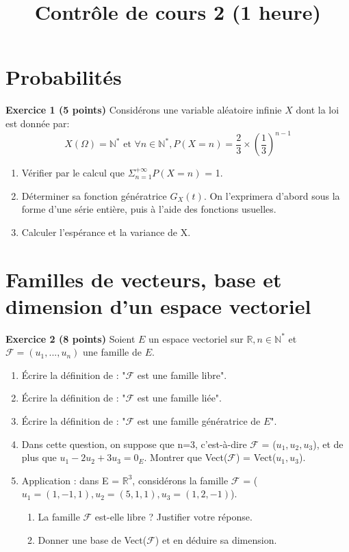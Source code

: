 \documentclass{article}
\author{}
\date{}
\title{Contrôle de cours 2 (1 heure)}
\begin{document}
\maketitle
\section{Probabilités}
\textbf{Exercice 1 (5 points)}\newline
Considérons une variable aléatoire infinie $X$ dont la loi est donnée par:
\[ X(\Omega) = \mathbb{N^{*}} \text{ et } \forall n\in\mathbb{N^{*}}, P(X=n) = \frac{2}{3}\times\left(\frac{1}{3}\right)^{n-1} \]
\begin{enumerate}
    \item Vérifier par le calcul que $\Sigma_{n=1}^{+\infty} P(X=n)$ = 1.
    \item Déterminer sa fonction génératrice $G_{X}(t)$. On l'exprimera d'abord sous la forme d'une série entière, puis à l'aide des fonctions usuelles.
    \item Calculer l'espérance et la variance de X.
\end{enumerate}

\section{Familles de vecteurs, base et dimension d'un espace vectoriel}
\textbf{Exercice 2 (8 points)}\newline
Soient $E$ un espace vectoriel sur $\mathbb{R}, n\in\mathbb{N}^{*}$ et $\mathcal{F} = (u_{1},...,u_{n})$ une famille de $E$.
\begin{enumerate}
    \item Écrire la définition de : "$\mathcal{F}$ est une famille libre".
    \item Écrire la définition de : "$\mathcal{F}$ est une famille liée".
    \item Écrire la définition de : "$\mathcal{F}$ est une famille génératrice de $E$".
    \item Dans cette question, on suppose que n=3, c'est-à-dire $\mathcal{F}$ = ($u_{1},u_{2},u_{3}$), et de plus que $u_{1}-2u_{2}+3u_{3} = 0_{E}$.\newline
    Montrer que Vect($\mathcal{F}$) = Vect($u_{1},u_{3}$).
    \item Application : dans E = $\mathbb{R}^{3}$, considérons la famille $\mathcal{F}$ = ($u_{1}=(1,-1,1),u_{2}=(5,1,1),u_{3}=(1,2,-1)$).
    \begin{enumerate}
        \item La famille $\mathcal{F}$ est-elle libre ? Justifier votre réponse.
        \item Donner une base de Vect($\mathcal{F}$) et en déduire sa dimension.
    \end{enumerate}
\end{enumerate}
\end{document}
